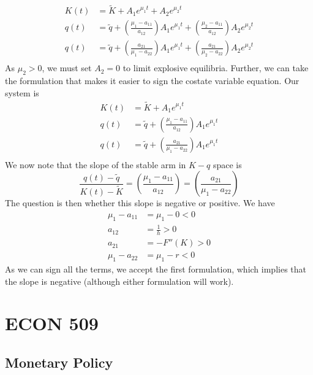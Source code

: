 \documentclass[12pt]{article}
\begin{document}
\begin{itemize}
    \[\begin{split}
        K(t) &= \widetilde{K} + A_1 e^{\mu_1t} + A_2e^{\mu_2t} \\
        q(t) &= \widetilde{q} + \left(\frac{\mu_1-a_{11}}{a_{12}}\right)A_1e^{\mu_1t} + \left(\frac{\mu_2-a_{11}}{a_{12}}\right)A_2e^{\mu_2t} \\
        q(t) &= \widetilde{q} + \left(\frac{a_{21}}{\mu_1-a_{22}}\right)A_1e^{\mu_1t} + \left(\frac{a_{21}}{\mu_2-a_{22}}\right)A_2e^{\mu_2t} \\
    \end{split}\]
    As $\mu_2 > 0$, we must set $A_2 = 0$ to limit explosive equilibria. Further, we can take the formulation that makes it easier to sign the costate variable equation. Our system is 
    \[\begin{split}
        K(t) &= \widetilde{K} + A_1 e^{\mu_1t} \\
        q(t) &= \widetilde{q} + \left(\frac{\mu_1-a_{11}}{a_{12}}\right)A_1e^{\mu_1t} \\
        q(t) &= \widetilde{q} + \left(\frac{a_{21}}{\mu_1-a_{22}}\right)A_1e^{\mu_1t} \\
    \end{split}\]
    We now note that the slope of the stable arm in $K-q$ space is
    \[\frac{q(t) - \widetilde{q}}{K(t)-\widetilde{K}} = \left(\frac{\mu_1-a_{11}}{a_{12}}\right) = \left(\frac{a_{21}}{\mu_1-a_{22}}\right)\]
    The question is then whether this slope is negative or positive. We have
    \[\begin{split}
        \mu_1 - a_{11} &= \mu_1 - 0 < 0 \\
        a_{12} &= \frac{1}{h} > 0 \\
        a_{21} &= -F''(K) > 0 \\
        \mu_1 - a_{22} &= \mu_1 - r < 0
    \end{split}\]
    As we can sign all the terms, we accept the first formulation, which implies that the slope is negative (although either formulation will work).
\end{itemize}

\section{ECON 509}

\subsection{Monetary Policy}
\end{document}
